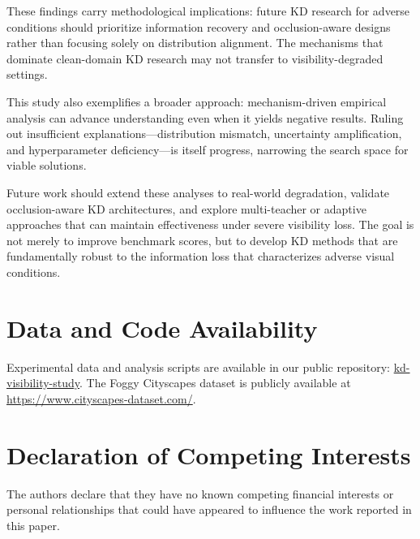 These findings carry methodological implications: future KD research for adverse conditions should prioritize information recovery and occlusion-aware designs rather than focusing solely on distribution alignment. The mechanisms that dominate clean-domain KD research may not transfer to visibility-degraded settings.

This study also exemplifies a broader approach: mechanism-driven empirical analysis can advance understanding even when it yields negative results. Ruling out insufficient explanations---distribution mismatch, uncertainty amplification, and hyperparameter deficiency---is itself progress, narrowing the search space for viable solutions.

Future work should extend these analyses to real-world degradation, validate occlusion-aware KD architectures, and explore multi-teacher or adaptive approaches that can maintain effectiveness under severe visibility loss. The goal is not merely to improve benchmark scores, but to develop KD methods that are fundamentally robust to the information loss that characterizes adverse visual conditions.

\section*{Data and Code Availability}

Experimental data and analysis scripts are available in our public repository: \href{https://github.com/godzhiwzz-create/kd-visibility-study}{kd-visibility-study}. The Foggy Cityscapes dataset is publicly available at \url{https://www.cityscapes-dataset.com/}.

\section*{Declaration of Competing Interests}

The authors declare that they have no known competing financial interests or personal relationships that could have appeared to influence the work reported in this paper.
